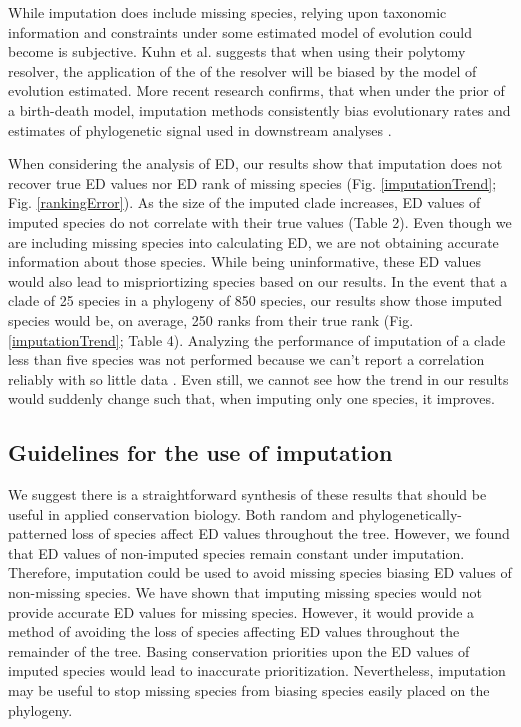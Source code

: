 \documentclass[12pt,english]{article}
\begin{document}
While imputation does include missing species, relying upon taxonomic information
and constraints under some estimated model of evolution could become is
subjective. Kuhn et al. \citeyear{2011} suggests that when using their polytomy
resolver, the application of the of the resolver will be biased by the model of
evolution estimated. More recent research confirms, that when under the prior of
a birth-death model, imputation methods consistently bias evolutionary rates and
estimates of phylogenetic signal used in downstream analyses
\autocite{Rabosky2014}. 

When considering the analysis of ED, our results show that imputation does not
recover true ED values nor ED rank of missing species (Fig. \ref{imputationTrend};
 Fig. \ref{rankingError}). As the size of the imputed clade increases, ED values of imputed
species do not correlate with their true values (Table 2). Even though we are
including missing species into calculating ED, we are not obtaining accurate
information about those species. While being uninformative, these ED values
would also lead to mispriortizing species based on our results. In the event
that a clade of 25 species in a phylogeny of 850 species, our results show those
imputed species would be, on average, 250 ranks from their true rank (Fig.
\ref{imputationTrend}; Table 4). Analyzing the performance of imputation of a
clade less than five species was not performed because we can't report a
correlation reliably with so little data \autocite{Crawley2012}. Even still, we
cannot see how the trend in our results would suddenly change such that, when
imputing only one species, it improves.  


\subsection*{Guidelines for the use of imputation}
We suggest there is a straightforward synthesis of these results that should be
useful in applied conservation biology. Both random and
phylogenetically-patterned loss of species affect ED values throughout the tree.
However, we found that ED values of non-imputed species remain constant under
imputation. Therefore, imputation could be used to avoid missing species biasing
ED values of non-missing species. We have shown that imputing missing species
would not provide accurate ED values for missing species. However, it would
provide a method of avoiding the loss of species affecting ED values throughout
the remainder of the tree. Basing conservation priorities upon the ED values of
imputed species would lead to inaccurate prioritization. Nevertheless,
imputation may be useful to stop missing species from biasing species easily
placed on the phylogeny. 
\end{document}
